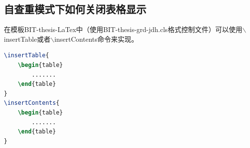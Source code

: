 \subsection{自查重模式下如何关闭表格显示}
在模板BIT-thesis-LaTex中（使用BIT-thesis-grd-jdh.cls格式控制文件）可以使用$\backslash$insertTable或者$\backslash$insertContents命令来实现。
\begin{lstlisting}[language={tex}, caption={}]
\insertTable{
	\begin{table}
		.......
	\end{table}
}
\insertContents{
	\begin{table}
		.......
	\end{table}
}
\end{lstlisting}